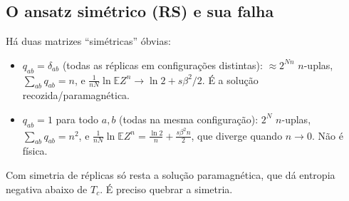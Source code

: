 \documentclass[11pt,a4paper]{article}
\newcommand{\E}{\mathbb{E}}
\begin{document}
\subsection{O ansatz simétrico (RS) e sua falha}
Há duas matrizes ``simétricas'' óbvias:
\begin{itemize}
\item $q_{ab}=\delta_{ab}$ (todas as réplicas em configurações distintas): $\approx 2^{Nn}$ $n$-uplas,
$\sum_{ab}q_{ab}=n$, e $\frac{1}{nN}\ln\E Z^n\to\ln2+s\beta^2/2$. É a solução recozida/paramagnética.
\item $q_{ab}=1$ para todo $a,b$ (todas na mesma configuração): $2^N$ $n$-uplas, $\sum_{ab}q_{ab}=n^2$,
e $\frac{1}{nN}\ln\E Z^n=\frac{\ln2}{n}+\frac{s\beta^2n}{2}$, que diverge quando $n\to0$. Não é física.
\end{itemize}
Com simetria de réplicas só resta a solução paramagnética, que dá entropia negativa abaixo de $T_c$.
É preciso quebrar a simetria.
\end{document}
